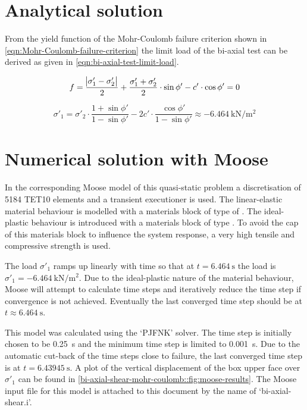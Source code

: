 \section{Analytical solution}
\label{bi-axial-shear-mohr-coulomb:sec:analytical-solution}

From the yield function of the Mohr-Coulomb failure criterion shown in
\autoref{eqn:Mohr-Coulomb-failure-criterion} the limit load of the bi-axial
test can be derived as given in \autoref{eqn:bi-axial-test-limit-load}.

\begin{equation}
    \label{eqn:Mohr-Coulomb-failure-criterion}
    f = \frac{\abs{\sigma'_1 - \sigma'_2}}{2} + \frac{\sigma'_1 + \sigma'_2}{2} \cdot \sin{\phi'} - c' \cdot \cos{\phi'} = 0
\end{equation}

\begin{equation}
    \label{eqn:bi-axial-test-limit-load}
    \sigma'_1 = \sigma'_2 \cdot \frac{1 + \sin{\phi'}}{1 - \sin{\phi'}} - 2c' \cdot \frac{\cos{\phi'}}{1 - \sin{\phi'}}
    \approx \qty{-6.464}{\kilo\newton\per\square\metre}
\end{equation}

\section{Numerical solution with Moose}
\label{bi-axial-shear-mohr-coulomb:sec:moose}

In the corresponding Moose model of this quasi-static problem a discretisation
of \qty{5184}{} TET10 elements and a transient executioner is used. The
linear-elastic material behaviour is modelled with a materials block of type of
. The ideal-plastic behaviour is
introduced with a materials block of type
. To avoid the cap of this materials
block to influence the system response, a very high tensile and compressive
strength is used.

The load $\sigma'_1$ ramps up linearly with time so that at $t =
    \qty{6.464}{\second}$ the load is $\sigma'_1 =
    \qty{-6.464}{\kilo\newton\per\square\metre}$. Due to the ideal-plastic nature
of the material behaviour, Moose will attempt to calculate time steps and
iteratively reduce the time step if convergence is not achieved. Eventually the
last converged time step should be at $t \approx \qty{6.464}{\second}$.

This model was calculated using the ‘PJFNK’ solver. The time step is initially
chosen to be \qty{0.25}{\second} and the minimum time step is limited to
\qty{0.001}{\second}. Due to the automatic cut-back of the time steps close to
failure, the last converged time step is at $t=\qty{6.43945}{\second}$. A plot
of the vertical displacement of the box upper face over $\sigma'_1$ can be
found in \autoref{bi-axial-shear-mohr-coulomb::fig:moose-results}. The Moose
input file for this model is attached to this document by the name of
‘bi-axial-shear.i’.

